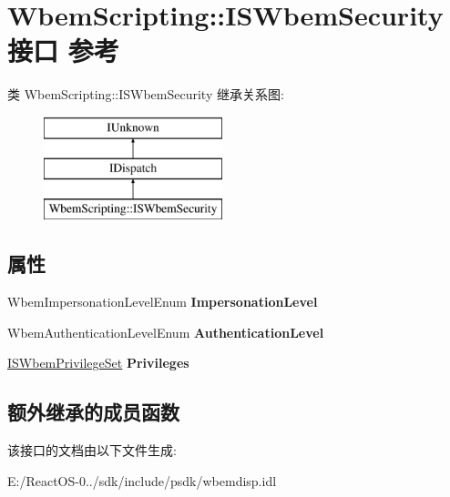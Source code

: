\hypertarget{interface_wbem_scripting_1_1_i_s_wbem_security}{}\section{Wbem\+Scripting\+:\+:I\+S\+Wbem\+Security接口 参考}
\label{interface_wbem_scripting_1_1_i_s_wbem_security}
类 Wbem\+Scripting\+:\+:I\+S\+Wbem\+Security 继承关系图\+:\begin{figure}[H]
\begin{center}
\leavevmode
\includegraphics[height=3.000000cm]{interface_wbem_scripting_1_1_i_s_wbem_security}
\end{center}
\end{figure}
\subsection*{属性}
\begin{DoxyCompactItemize}
\item 
\mbox{\label{interface_wbem_scripting_1_1_i_s_wbem_security_a458c14588a1f09fa3051253b2bb9b605}} 
Wbem\+Impersonation\+Level\+Enum {\bfseries Impersonation\+Level}
\item 
\mbox{\label{interface_wbem_scripting_1_1_i_s_wbem_security_a38c94cc9b33db3c9a66bf87a03a9b1cc}} 
Wbem\+Authentication\+Level\+Enum {\bfseries Authentication\+Level}
\item 
\mbox{\label{interface_wbem_scripting_1_1_i_s_wbem_security_aaece9f8f830f41bc042d353911948d38}} 
\hyperlink{interface_wbem_scripting_1_1_i_s_wbem_privilege_set}{I\+S\+Wbem\+Privilege\+Set} {\bfseries Privileges}
\end{DoxyCompactItemize}
\subsection*{额外继承的成员函数}


该接口的文档由以下文件生成\+:\begin{DoxyCompactItemize}
\item 
E\+:/\+React\+O\+S-\/0../sdk/include/psdk/wbemdisp.\+idl\end{DoxyCompactItemize}
